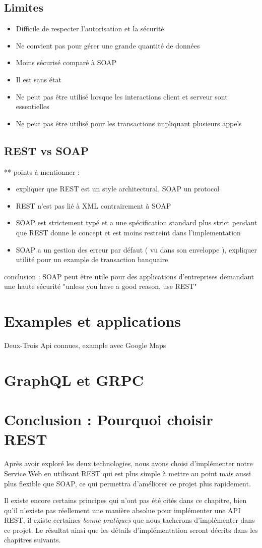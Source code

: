 \subsection{Limites}
\begin{itemize}
	\item Difficile de respecter l'autorisation et la sécurité
	\item Ne convient pas pour gérer une grande quantité de données
	\item Moins sécurisé comparé à SOAP
	\item Il est sans état
	\item Ne peut pas être utilisé lorsque les interactions client et serveur sont essentielles
	\item Ne peut pas être utilisé pour les transactions impliquant plusieurs appels
\end{itemize}
\subsection{REST vs SOAP}
** points à mentionner : 
\begin{itemize}
	\item expliquer que REST est un style architectural, SOAP un protocol
	\item REST n'est pas lié à XML contrairement à SOAP
	\item SOAP est strictement typé et a une spécification standard plus strict pendant que REST donne le concept et est moins restreint dans l'implementation 
	\item SOAP a un gestion des erreur par défaut ( vu dans son enveloppe ), expliquer utilité pour un example de transaction banquaire
\end{itemize}				 
			
conclusion : SOAP peut être utile pour des applications d'entreprises demandant une haute sécurité "unless you have a good reason, use REST" 
\section{Examples et applications}
Deux-Trois Api connues, example avec Google Maps
\section{GraphQL et GRPC}
			
\section{Conclusion : Pourquoi choisir REST}
	Après avoir exploré les deux technologies, nous avons choisi d'implémenter notre Service Web en utilisant REST qui est plus simple à mettre au point mais aussi plus flexible que SOAP, ce qui permettra d'améliorer ce projet plus rapidement.
	
	Il existe encore certains principes qui n'ont pas été cités dans ce chapitre, bien qu'il n'existe pas réellement une manière absolue pour implémenter une API REST, il existe certaines \emph{bonne pratiques} que nous tacherons d'implémenter dans ce projet. Le résultat ainsi que les détails d'implémentation seront décrits dans les chapitres suivants.